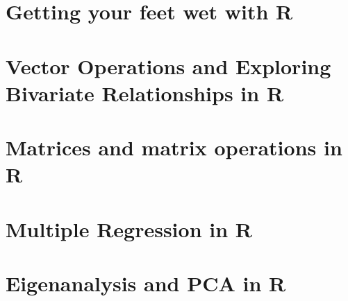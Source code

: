 \documentclass[10pt,oneside,bigheadings,tablecaptionabove]{scrbook}
\begin{document}


\clearscrheadfoot
\pagestyle{scrheadings}

\titleLL
\clearpage
{}


\tableofcontents
\clearpage


\clearscrheadfoot
{}
\ihead{\tikzhead\headmark}
\ohead{\pagemark}
\pagestyle{scrheadings}
\renewcommand*{\chapterpagestyle}{scrheadings}


\chapter{Getting your feet wet with R}



\chapter{Vector Operations and Exploring Bivariate Relationships in R}


\chapter{Matrices and matrix operations in R}


\chapter{Multiple Regression in R}



\chapter{Eigenanalysis and PCA in R}


% 

% 
\end{document}
